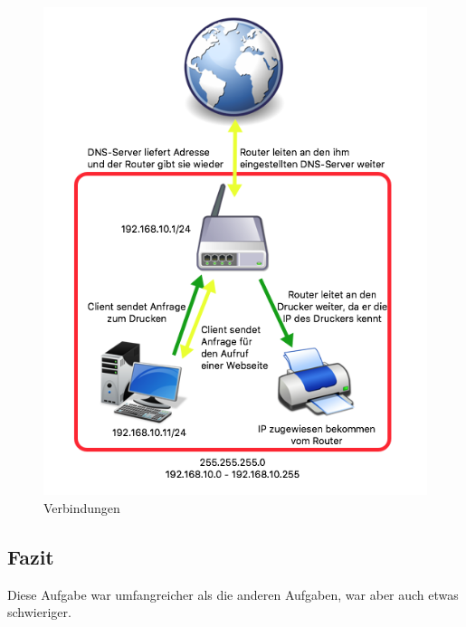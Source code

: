 \begin{figure}[H]
	\centering
	\includegraphics[width=0.6 \linewidth]{images/internet}
	\caption{Verbindungen} \label{internet}
\end{figure}  

\subsection{Fazit}
Diese Aufgabe war umfangreicher als die anderen Aufgaben, war aber auch etwas schwieriger.


